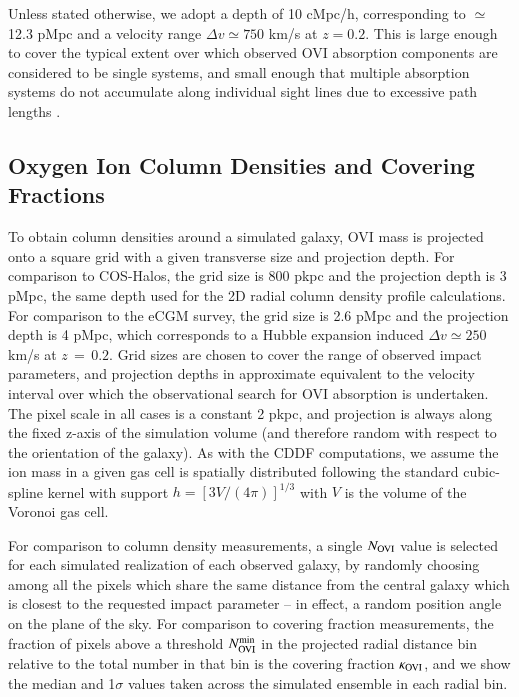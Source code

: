 \documentclass[useAMS,usenatbib]{mnras}
\newcommand{\ovi}{OVI\xspace}
\begin{document}
Unless stated otherwise, we adopt a depth of 10 cMpc/h, corresponding to $\simeq$ 12.3 pMpc and a velocity range $\Delta v \simeq 750$ km/s at $z=0.2$. This is large enough to cover the typical extent over which observed \ovi absorption components are considered to be single systems, and small enough that multiple absorption systems do not accumulate along individual sight lines due to excessive path lengths \citep[see][and Section \ref{subsec_cddfs} below for the inherent limitations of this approach]{danforth16}.

\subsection{Oxygen Ion Column Densities and Covering Fractions} \label{sec_coldens}

To obtain column densities around a simulated galaxy, \ovi mass is projected onto a square grid with a given transverse size and projection depth. For comparison to COS-Halos, the grid size is 800 pkpc and the projection depth is 3 pMpc, the same depth used for the 2D radial column density profile calculations. For comparison to the eCGM survey, the grid size is 2.6 pMpc and the projection depth is 4 pMpc, which corresponds to a Hubble expansion induced $\Delta v \simeq 250$ km/s at $z\,=\,0.2$. Grid sizes are chosen to cover the range of observed impact parameters, and projection depths in approximate equivalent to the velocity interval over which the observational search for \ovi absorption is undertaken. The pixel scale in all cases is a constant 2 pkpc, and projection is always along the fixed z-axis of the simulation volume (and therefore random with respect to the orientation of the galaxy). As with the CDDF computations, we assume the ion mass in a given gas cell is spatially distributed following the standard cubic-spline kernel with support $h = [3V/(4\pi)]^{1/3}$ with $V$ is the volume of the Voronoi gas cell.

For comparison to column density measurements, a single $N_{\rm OVI}$ value is selected for each simulated realization of each observed galaxy, by randomly choosing among all the pixels which share the same distance from the central galaxy which is closest to the requested impact parameter -- in effect, a random position angle on the plane of the sky. For comparison to covering fraction measurements, the fraction of pixels above a threshold $N_{\rm OVI}^{\rm min}$ in the projected radial distance bin relative to the total number in that bin is the covering fraction $\kappa_{\rm OVI}$, and we show the median and 1$\sigma$ values taken across the simulated ensemble in each radial bin. %
\end{document}

